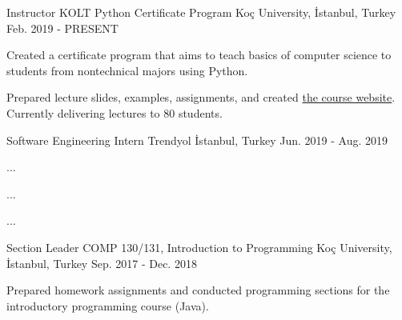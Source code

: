 
\vspace*{-1.5mm}
\begin{cventries}

  \cventry
    {Instructor}
    {KOLT Python Certificate Program}
    {Koç University, İstanbul, Turkey}
    {Feb. 2019 - PRESENT}
    {
      \begin{cvitems}
        \item {Created a certificate program that aims to teach basics of computer science to students from nontechnical majors using Python.}
        \item {Prepared lecture slides, examples, assignments, and created \href{https://koltpython.github.io}{the course website}. Currently delivering lectures to 80 students.}
      \end{cvitems}
    }

  \cventry
    {Software Engineering Intern}
    {Trendyol}
    {İstanbul, Turkey}
    {Jun. 2019 - Aug. 2019}
    {
      \begin{cvitems}
        \item {...}
        \item {...}
        \item {...}
      \end{cvitems}
    }

  \cventry
    {Section Leader}%
    {COMP 130/131, Introduction to Programming}%
    {Koç University, İstanbul, Turkey}
    {Sep. 2017 - Dec. 2018}
    {
      \begin{cvitems}
        \item {Prepared homework assignments and conducted programming sections for the introductory programming course (Java).}
      \end{cvitems}
    }



\end{cventries}
